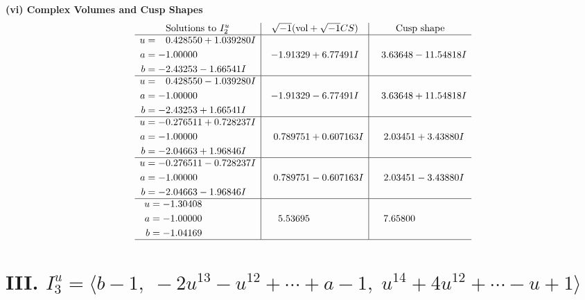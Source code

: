 \documentclass[1p]{elsarticle_modified}
\theoremstyle{definition}
\newcommand{\I}{\sqrt{-1}}
\begin{document}
\newpage\flushleft \textbf{(vi) Complex Volumes and Cusp Shapes}
$$\begin{array}{c|c|c}  
\text{Solutions to }I^u_{2}& \I (\text{vol} + \sqrt{-1}CS) & \text{Cusp shape}\\
 \hline 
\begin{aligned}
u &= \phantom{-}0.428550 + 1.039280 I \\
a &= -1.00000\phantom{ +0.000000I} \\
b &= -2.43253 - 1.66541 I\end{aligned}
 & -1.91329 + 6.77491 I & \phantom{-}3.63648 - 11.54818 I \\ \hline\begin{aligned}
u &= \phantom{-}0.428550 - 1.039280 I \\
a &= -1.00000\phantom{ +0.000000I} \\
b &= -2.43253 + 1.66541 I\end{aligned}
 & -1.91329 - 6.77491 I & \phantom{-}3.63648 + 11.54818 I \\ \hline\begin{aligned}
u &= -0.276511 + 0.728237 I \\
a &= -1.00000\phantom{ +0.000000I} \\
b &= -2.04663 + 1.96846 I\end{aligned}
 & \phantom{-}0.789751 + 0.607163 I & \phantom{-}2.03451 + 3.43880 I \\ \hline\begin{aligned}
u &= -0.276511 - 0.728237 I \\
a &= -1.00000\phantom{ +0.000000I} \\
b &= -2.04663 - 1.96846 I\end{aligned}
 & \phantom{-}0.789751 - 0.607163 I & \phantom{-}2.03451 - 3.43880 I \\ \hline\begin{aligned}
u &= -1.30408\phantom{ +0.000000I} \\
a &= -1.00000\phantom{ +0.000000I} \\
b &= -1.04169\phantom{ +0.000000I}\end{aligned}
 & \phantom{-}5.53695\phantom{ +0.000000I} & \phantom{-}7.65800\phantom{ +0.000000I}\\
 \hline 
 \end{array}$$\newpage\newpage\renewcommand{\arraystretch}{1}
\centering \section*{III. $I^u_{3}= \langle b-1,\;-2 u^{13}- u^{12}+\cdots+a-1,\;u^{14}+4 u^{12}+\cdots- u+1 \rangle$}
\end{document}

